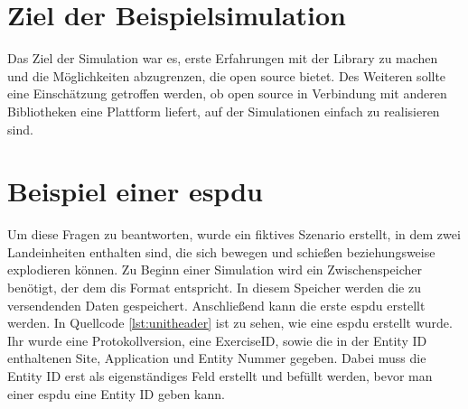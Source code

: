 \section{Ziel der Beispielsimulation}
Das Ziel der  Simulation war es, erste Erfahrungen mit der Library zu machen und die Möglichkeiten abzugrenzen, die \glqq open source\grqq{} bietet. Des Weiteren sollte eine Einschätzung getroffen werden, ob \glqq open source\grqq{} in Verbindung mit anderen Bibliotheken eine Plattform liefert, auf der Simulationen einfach zu realisieren sind.

\section{Beispiel einer \ac{espdu}} 
Um diese Fragen zu beantworten, wurde ein fiktives Szenario erstellt, in dem zwei Landeinheiten enthalten sind, die sich bewegen und  schießen beziehungsweise explodieren können. 
Zu Beginn einer Simulation wird ein Zwischenspeicher benötigt, der dem \ac{dis} Format entspricht. In diesem Speicher werden die zu versendenden Daten gespeichert.   
Anschließend kann die erste \ac{espdu} erstellt werden. In Quellcode \ref{lst:unitheader} ist zu sehen, wie eine \ac{espdu} erstellt wurde. Ihr wurde eine Protokollversion, eine ExerciseID, sowie die in der Entity ID enthaltenen Site, Application und Entity Nummer gegeben. Dabei muss die Entity ID erst als eigenständiges Feld erstellt und befüllt werden, bevor man einer \ac{espdu} eine Entity ID geben kann.

